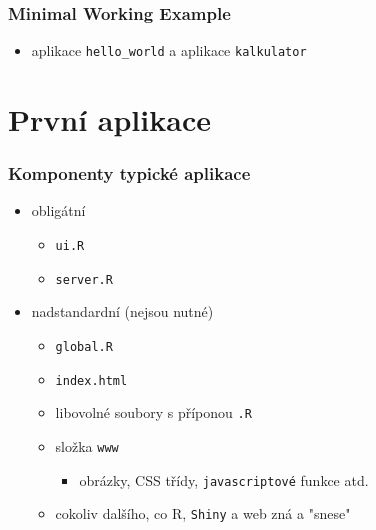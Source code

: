 \documentclass[t]{beamer}
\begin{document}

\begin{frame}
  \frametitle{Minimal Working Example}
  \begin{itemize}
    \item aplikace \texttt{hello\_world} a aplikace \texttt{kalkulator}
    \begin{center}
      \href{https://github.com/LStepanek/Vyvoj\_aplikaci\_v\_R/}{%
      }
    \end{center}
  \end{itemize}
\end{frame}



\section{První aplikace}


\begin{frame}
  \frametitle{Komponenty typické aplikace}
  \begin{itemize}
    \item obligátní
    \begin{itemize}
      \item \texttt{ui.R}
      \item \texttt{server.R}
    \end{itemize}
    \item nadstandardní (nejsou nutné)
    \begin{itemize}
      \item \texttt{global.R}
      \item \texttt{index.html}
      \item libovolné soubory s příponou \texttt{.R}
      \item složka \texttt{www}
      \begin{itemize}
        \item obrázky, CSS třídy, \texttt{javascriptové} funkce atd.
      \end{itemize}
      \item cokoliv dalšího, co \textsf{R}, \texttt{Shiny}
      a web zná a "snese"
    \end{itemize}
  \end{itemize}
\end{frame}
\end{document}
